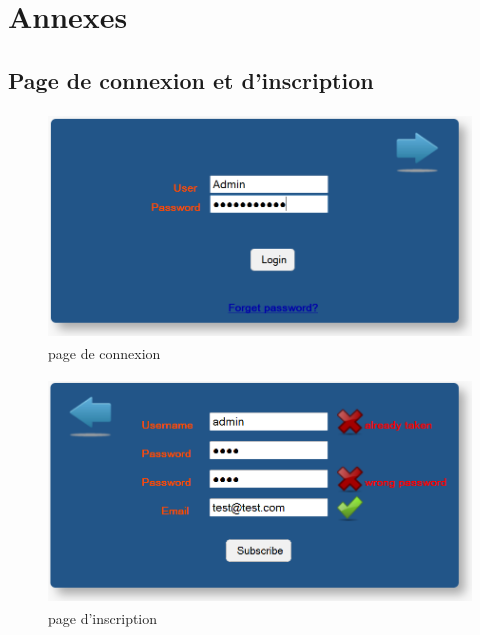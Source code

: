 \newpage
\chapter*{Annexes}

\setcounter{page}{1}




\section{Page de connexion et d'inscription}
\label{annexe/espace_nom}

\begin{figure}[!h]
	\begin{center}
		\includegraphics[width=12cm,height=6cm]{login.png}	
		\caption{page de connexion}
	\end{center}
\end{figure}

\begin{figure}[!h]
	\begin{center}
		\includegraphics[width=12cm,height=6cm]{subscribe.png}
		\caption{page d'inscription}
	\end{center}
\end{figure}

\newpage

